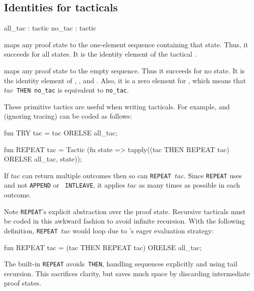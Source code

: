 \subsection{Identities for tacticals}
\begin{ttbox} 
all_tac : tactic
no_tac  : tactic
\end{ttbox}
\begin{ttdescription}
\item[\ttindexbold{all_tac}] 
maps any proof state to the one-element sequence containing that state.
Thus, it succeeds for all states.  It is the identity element of the
tactical \@.

\item[\ttindexbold{no_tac}] 
maps any proof state to the empty sequence.  Thus it succeeds for no state.
It is the identity element of , , and 
\@.  Also, it is a zero element for , which means that
\hbox{\tt$tac$ THEN no_tac} is equivalent to {\tt no_tac}.
\end{ttdescription}
These primitive tactics are useful when writing tacticals.  For example,
 and  (ignoring tracing) can be coded
as follows: 
\begin{ttbox} 
fun TRY tac = tac ORELSE all_tac;

fun REPEAT tac = Tactic
     (fn state => tapply((tac THEN REPEAT tac) ORELSE all_tac,
                         state));
\end{ttbox}
If $tac$ can return multiple outcomes then so can \hbox{\tt REPEAT $tac$}.
Since {\tt REPEAT} uses  and not {\tt APPEND} or {\tt
INTLEAVE}, it applies $tac$ as many times as possible in each
outcome.

\begin{warn}
Note {\tt REPEAT}'s explicit abstraction over the proof state.  Recursive
tacticals must be coded in this awkward fashion to avoid infinite
recursion.  With the following definition, \hbox{\tt REPEAT $tac$} would
loop due to \ML's eager evaluation strategy:
\begin{ttbox} 
fun REPEAT tac = (tac THEN REPEAT tac) ORELSE all_tac;
\end{ttbox}
\par\noindent
The built-in {\tt REPEAT} avoids~{\tt THEN}, handling sequences explicitly
and using tail recursion.  This sacrifices clarity, but saves much space by
discarding intermediate proof states.
\end{warn}


